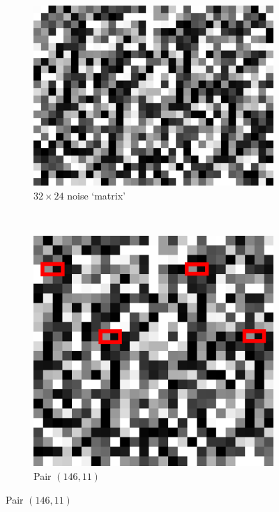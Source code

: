 \documentclass{llncs}
\begin{document}
\begin{figure}
\centering
\begin{subfigure}[t]{0.33\textwidth}
\centering
\includegraphics[scale=.25]{img/Garamond-I.png}
\caption{$32\times 24$ noise `matrix'}
\label{fig-example1a}
\end{subfigure}%
~
\begin{subfigure}[t]{0.33\textwidth}
\centering
\includegraphics[scale=.25]{img/Garamond-I-highlight.png}
\caption{Pair $(146,11)$}
\label{fig-example1b}

\end{subfigure}
\end{figure}
\end{document}
